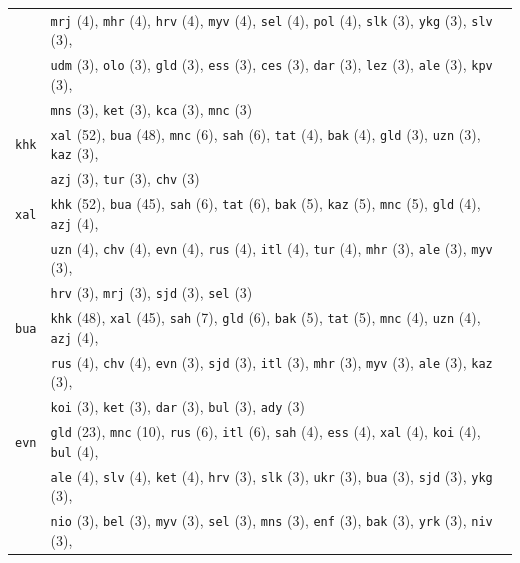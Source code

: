 \begin{center}
\begin{longtable}{ll}
 & \texttt{mrj} (4), \texttt{mhr} (4), \texttt{hrv} (4), \texttt{myv} (4), \texttt{sel} (4), \texttt{pol} (4), \texttt{slk} (3), \texttt{ykg} (3), \texttt{slv} (3),\\
 & \texttt{udm} (3), \texttt{olo} (3), \texttt{gld} (3), \texttt{ess} (3), \texttt{ces} (3), \texttt{dar} (3), \texttt{lez} (3), \texttt{ale} (3), \texttt{kpv} (3),\\
 & \texttt{mns} (3), \texttt{ket} (3), \texttt{kca} (3), \texttt{mnc} (3) \\
\texttt{khk} & \texttt{xal} (52), \texttt{bua} (48), \texttt{mnc} (6), \texttt{sah} (6), \texttt{tat} (4), \texttt{bak} (4), \texttt{gld} (3), \texttt{uzn} (3), \texttt{kaz} (3), \\
 & \texttt{azj} (3), \texttt{tur} (3), \texttt{chv} (3) \\
\texttt{xal} & \texttt{khk} (52), \texttt{bua} (45), \texttt{sah} (6), \texttt{tat} (6), \texttt{bak} (5), \texttt{kaz} (5), \texttt{mnc} (5), \texttt{gld} (4), \texttt{azj} (4), \\
 & \texttt{uzn} (4), \texttt{chv} (4), \texttt{evn} (4), \texttt{rus} (4), \texttt{itl} (4), \texttt{tur} (4), \texttt{mhr} (3), \texttt{ale} (3), \texttt{myv} (3), \\
 & \texttt{hrv} (3), \texttt{mrj} (3), \texttt{sjd} (3), \texttt{sel} (3) \\
\texttt{bua} & \texttt{khk} (48), \texttt{xal} (45), \texttt{sah} (7), \texttt{gld} (6), \texttt{bak} (5), \texttt{tat} (5), \texttt{mnc} (4), \texttt{uzn} (4), \texttt{azj} (4), \\
 & \texttt{rus} (4), \texttt{chv} (4), \texttt{evn} (3), \texttt{sjd} (3), \texttt{itl} (3), \texttt{mhr} (3), \texttt{myv} (3), \texttt{ale} (3), \texttt{kaz} (3), \\
 & \texttt{koi} (3), \texttt{ket} (3), \texttt{dar} (3), \texttt{bul} (3), \texttt{ady} (3) \\
\texttt{evn} & \texttt{gld} (23), \texttt{mnc} (10), \texttt{rus} (6), \texttt{itl} (6), \texttt{sah} (4), \texttt{ess} (4), \texttt{xal} (4), \texttt{koi} (4), \texttt{bul} (4), \\
 & \texttt{ale} (4), \texttt{slv} (4), \texttt{ket} (4), \texttt{hrv} (3), \texttt{slk} (3), \texttt{ukr} (3), \texttt{bua} (3), \texttt{sjd} (3), \texttt{ykg} (3), \\
 & \texttt{nio} (3), \texttt{bel} (3), \texttt{myv} (3), \texttt{sel} (3), \texttt{mns} (3), \texttt{enf} (3), \texttt{bak} (3), \texttt{yrk} (3), \texttt{niv} (3), \\

\end{longtable}
\end{center}
